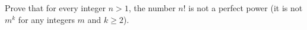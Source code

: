 Prove that for every integer $n>1$, the number $n!$ is not a perfect power (it is not $m^k$ for any integers $m$ and $k\ge2$).
